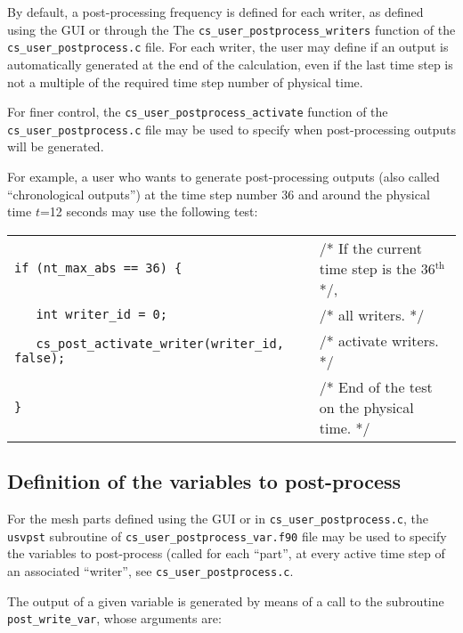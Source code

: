 {{{By default, a post-processing frequency is defined for each writer,
as defined using the GUI or through the The
\texttt{cs\_user\_postprocess\_writers} 
function of the \texttt{cs\_user\_postprocess.c} file. For each writer,
the user may define if an output is automatically generated at the end
of the calculation, even if the last time step is not a multiple of the
required time step number of physical time.

For finer control, the \texttt{cs\_user\_postprocess\_activate} function of the
\texttt{cs\_user\_postprocess.c} file may be used to specify when
post-processing outputs will be generated.

For example, a user who wants to generate post-processing outputs (also
called ``chronological outputs'') at
the time step number 36 and around the physical time $t$=12 seconds may
use the following test:\\

\begin{tabular}{ll}
\mbox{\texttt{if (nt\_max\_abs == 36) \{}}
                    & /* If the current time step is the 36$^{\text{th}}$ */,\\
\mbox{\texttt{~~~int writer\_id = 0;}}
                    & /* all writers. */ \\
\mbox{\texttt{~~~cs\_post\_activate\_writer(writer\_id, false);}}
                    & /* activate writers. */ \\
\mbox{\texttt{\}}}
                    & /* End of the test on the physical time. */ \\
\end{tabular}

\subsection{Definition of the variables to post-process}

For the mesh parts defined using the GUI or in \texttt{cs\_user\_postprocess.c},
the \texttt{usvpst} subroutine  of \texttt{cs\_user\_postprocess\_var.f90} file
may be used to specify the variables to
post-process (called for each ``part'', at every active time step of an
associated ``writer'', see \texttt{cs\_user\_postprocess.c}.

The output of a given variable is generated by means of a call to the subroutine
\texttt{post\_write\_var}, whose arguments are:

}}}
